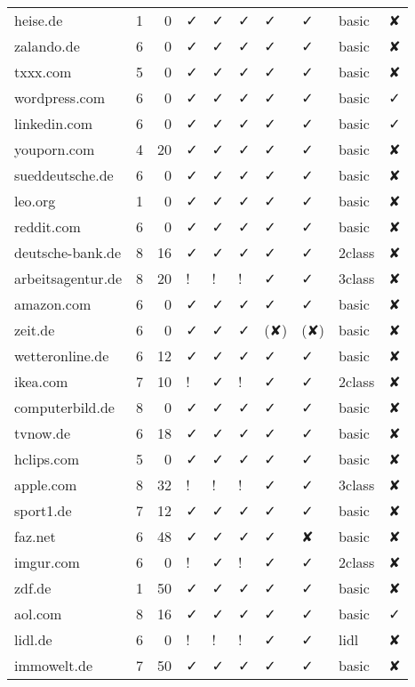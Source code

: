 {\begin{longtable}{lrrlllllll}
		heise.de & 1     & 0     & ✓ & ✓ & ✓ & ✓ & ✓ & basic & ✘\\
		zalando.de & 6     & 0     & ✓ & ✓ & ✓ & ✓ & ✓ & basic & ✘\\
		txxx.com & 5     & 0     & ✓ & ✓ & ✓ & ✓ & ✓ & basic & ✘\\
		wordpress.com & 6     & 0     & ✓ & ✓ & ✓ & ✓ & ✓ & basic & ✓\\
		linkedin.com & 6     & 0     & ✓ & ✓ & ✓ & ✓ & ✓ & basic & ✓\\
		youporn.com & 4     & 20    & ✓ & ✓ & ✓ & ✓ & ✓ & basic & ✘\\
		sueddeutsche.de & 6     & 0     & ✓ & ✓ & ✓ & ✓ & ✓ & basic & ✘\\
		leo.org & 1     & 0     & ✓ & ✓ & ✓ & ✓ & ✓ & basic & ✘\\
		reddit.com & 6     & 0     & ✓ & ✓ & ✓ & ✓ & ✓ & basic & ✘\\
		deutsche-bank.de & 8     & 16    & ✓ & ✓ & ✓ & ✓ & ✓ & 2class & ✘\\
		arbeitsagentur.de & 8     & 20    & ! & ! & ! & ✓ & ✓ & 3class & ✘\\
		amazon.com & 6     & 0     & ✓ & ✓ & ✓ & ✓ & ✓ & basic & ✘\\
		zeit.de & 6     & 0     & ✓ & ✓ & ✓ & (✘) & (✘) & basic & ✘\\
		wetteronline.de & 6     & 12    & ✓ & ✓ & ✓ & ✓ & ✓ & basic & ✘\\
		ikea.com & 7     & 10    & ! & ✓ & ! & ✓ & ✓ & 2class & ✘\\
		computerbild.de & 8     & 0     & ✓ & ✓ & ✓ & ✓ & ✓ & basic & ✘\\
		tvnow.de & 6     & 18    & ✓ & ✓ & ✓ & ✓ & ✓ & basic & ✘\\
		hclips.com & 5     & 0     & ✓ & ✓ & ✓ & ✓ & ✓ & basic & ✘\\
		apple.com & 8     & 32    & ! & ! & ! & ✓ & ✓ & 3class & ✘\\
		sport1.de & 7     & 12    & ✓ & ✓ & ✓ & ✓ & ✓ & basic & ✘\\
		faz.net & 6     & 48    & ✓ & ✓ & ✓ & ✓ & ✘ & basic & ✘\\
		imgur.com & 6     & 0     & ! & ✓ & ! & ✓ & ✓ & 2class & ✘\\
		zdf.de & 1     & 50    & ✓ & ✓ & ✓ & ✓ & ✓ & basic & ✘\\
		aol.com & 8     & 16    & ✓ & ✓ & ✓ & ✓ & ✓ & basic & ✓\\
		lidl.de & 6     & 0     & ! & ! & ! & ✓ & ✓ & lidl  & ✘\\
		immowelt.de & 7     & 50    & ✓ & ✓ & ✓ & ✓ & ✓ & basic & ✘\\

\end{longtable}}
